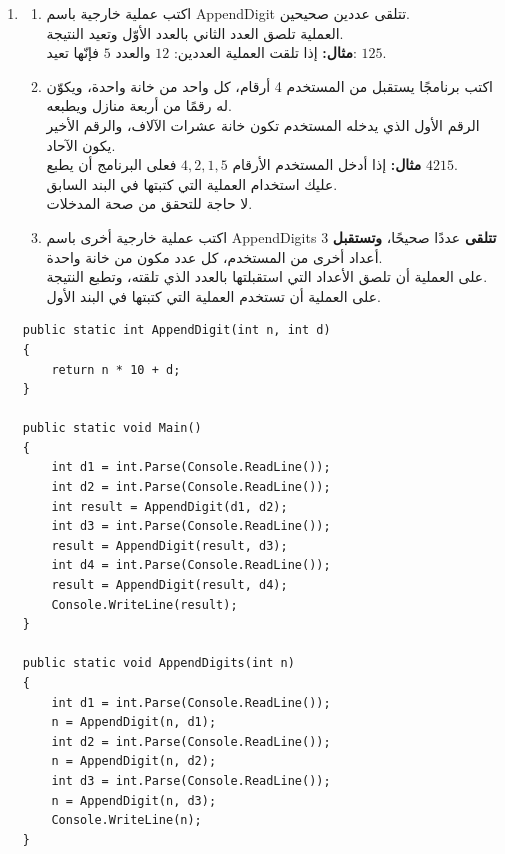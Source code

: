 ﻿\documentclass[12pt]{article}
\begin{document}
\begin{enumerate}[itemsep=3em]
\begin{enumerate}
\clearpage
\item
\begin{enumerate}
    \item اكتب عملية خارجية باسم \textenglish{AppendDigit} تتلقى عددين صحيحين. \\
    العملية تلصق العدد الثاني بالعدد الأوّل وتعيد النتيجة. \\
    \textbf{مثال:} إذا تلقت العملية العددين: $12$ والعدد $5$ فإنّها تعيد: $125$.
    \item اكتب برنامجًا يستقبل من المستخدم 4 أرقام، كل واحد من خانة واحدة، ويكوّن له رقمًا من أربعة منازل ويطبعه. \\
    الرقم الأول الذي يدخله المستخدم تكون خانة عشرات الآلاف، والرقم الأخير يكون الآحاد. \\
    \textbf{مثال:} إذا أدخل المستخدم الأرقام $4,2,1,5$ فعلى البرنامج أن يطبع $4215$. \\
    عليك استخدام العملية التي كتبتها في البند السابق. \\
    لا حاجة للتحقق من صحة المدخلات.
    \item اكتب عملية خارجية أخرى باسم \textenglish{AppendDigits} \textbf{تتلقى} عددًا صحيحًا، \textbf{وتستقبل} 3 أعداد أخرى من المستخدم، كل عدد مكون من خانة واحدة. \\
    على العملية أن تلصق الأعداد التي استقبلتها بالعدد الذي تلقته، وتطبع النتيجة. \\
    على العملية أن تستخدم العملية التي كتبتها في البند الأول.
\end{enumerate}
    \ifwithsols
\begin{boxSolution}
\begin{english}
\begin{verbatim}
public static int AppendDigit(int n, int d)
{
    return n * 10 + d;
}

public static void Main()
{
    int d1 = int.Parse(Console.ReadLine());
    int d2 = int.Parse(Console.ReadLine());
    int result = AppendDigit(d1, d2);
    int d3 = int.Parse(Console.ReadLine());
    result = AppendDigit(result, d3);
    int d4 = int.Parse(Console.ReadLine());
    result = AppendDigit(result, d4);
    Console.WriteLine(result);
}

public static void AppendDigits(int n)
{
    int d1 = int.Parse(Console.ReadLine());
    n = AppendDigit(n, d1);
    int d2 = int.Parse(Console.ReadLine());
    n = AppendDigit(n, d2);
    int d3 = int.Parse(Console.ReadLine());
    n = AppendDigit(n, d3);
    Console.WriteLine(n);
}
\end{verbatim}
\end{english}
\end{boxSolution}
\fi



\end{enumerate}
\end{enumerate}
\end{document}
